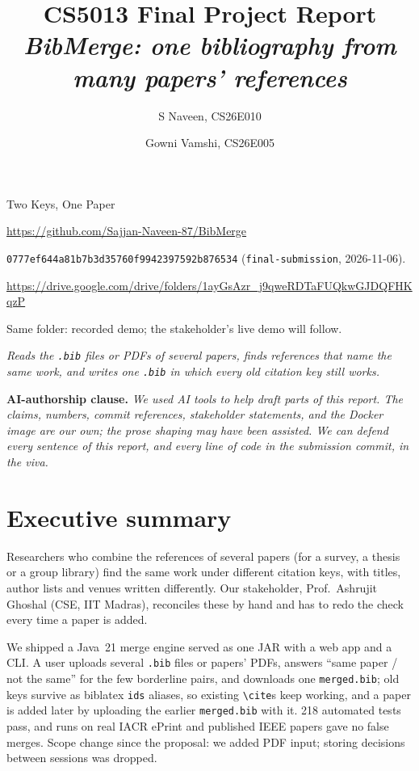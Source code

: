 \documentclass[11pt,a4paper]{article}
\title{CS5013 Final Project Report \\
       \large\textit{BibMerge: one bibliography from many papers' references}}
\author{S Naveen, CS26E010 \and Gowni Vamshi, CS26E005}
\date{}
\begin{document}
\maketitle

\vspace{-2.0em}

\begin{description}[leftmargin=!,labelwidth=\widthof{\textbf{Submission commit:}},nosep,font=\bfseries]
  \item[Team Name:]         Two Keys, One Paper
  \item[Repository:]      \url{https://github.com/Sajjan-Naveen-87/BibMerge}
  \item[Submission commit:] {\small\texttt{0777ef644a81b7b3d35760f9942397592b876534}} (\texttt{final-submission}, \mbox{2026-11-06}).
  \item[Docker image:]    {\footnotesize\url{https://drive.google.com/drive/folders/1ayGsAzr_j9qweRDTaFUQkwGJDQFHKqzP}}
  \item[Demo video:]      Same folder: recorded demo; the stakeholder's live demo will follow.
  \item[Tagline:]         \textit{Reads the \texttt{.bib} files or PDFs of several papers,
                          finds references that name the same work, and writes one
                          \texttt{.bib} in which every old citation key still works.}
\end{description}

\textbf{AI-authorship clause.}
\textit{%
We used AI tools to help draft parts of this report.  The claims,
numbers, commit references, stakeholder statements, and the Docker
image are our own; the prose shaping may have been assisted.  We can
defend every sentence of this report, and every line of code in the
submission commit, in the viva.%
}

\section{Executive summary}

Researchers who combine the references of several papers (for a survey, a
thesis or a group library) find the same work under different citation keys,
with titles, author lists and venues written differently.  Our stakeholder,
Prof.\ Ashrujit Ghoshal (CSE, IIT Madras), reconciles these by hand and has to
redo the check every time a paper is added.

We shipped a Java~21 merge engine served as one JAR with a web app and a CLI.
A user uploads several \texttt{.bib} files or papers' PDFs, answers ``same
paper / not the same'' for the few borderline pairs, and downloads one
\texttt{merged.bib}; old keys survive as biblatex \texttt{ids} aliases, so
existing \verb|\cite|s keep working, and a paper is added later by uploading
the earlier \texttt{merged.bib} with it.  218 automated tests pass, and runs
on real IACR ePrint and published IEEE papers gave no false merges.  Scope
change since the proposal: we added PDF input; storing decisions between
sessions was dropped.
\end{document}

